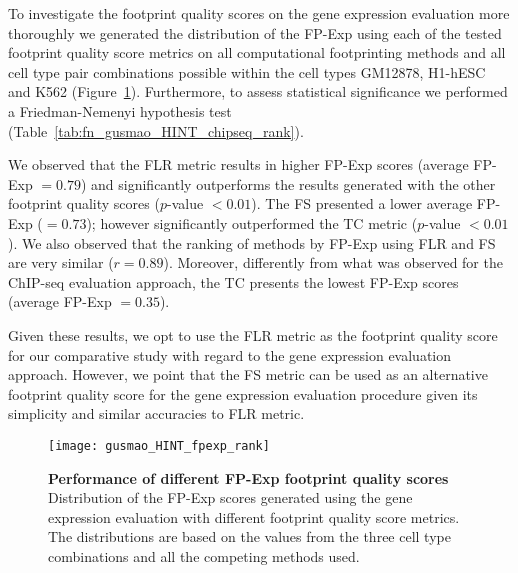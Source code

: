 To investigate the footprint quality scores on the gene expression evaluation more thoroughly we generated the distribution of the FP-Exp using each of the tested footprint quality score metrics on all computational footprinting methods and all cell type pair combinations possible within the cell types GM12878, H1-hESC and K562 (Figure~\ref{fig:gusmao_HINT_fpexp_rank}). Furthermore, to assess statistical significance we performed a Friedman-Nemenyi hypothesis test (Table~\ref{tab:fn_gusmao_HINT_chipseq_rank}).

We observed that the FLR metric results in higher FP-Exp scores (average FP-Exp $= 0.79$) and significantly outperforms the results generated with the other footprint quality scores ($p$-value $< 0.01$). The FS presented a lower average FP-Exp ($= 0.73$); however significantly outperformed the TC metric ($p$-value $< 0.01$). We also observed that the ranking of methods by FP-Exp using FLR and FS are very similar ($r=0.89$). Moreover, differently from what was observed for the ChIP-seq evaluation approach, the TC presents the lowest FP-Exp scores (average FP-Exp $= 0.35$).

Given these results, we opt to use the FLR metric as the footprint quality score for our comparative study with regard to the gene expression evaluation approach. However, we point that the FS metric can be used as an alternative footprint quality score for the gene expression evaluation procedure given its simplicity and similar accuracies to FLR metric.

\begin{figure}[h!]
\centering
\texttt{[image: gusmao\_HINT\_fpexp\_rank]}
\caption[Performance of different FP-Exp footprint quality scores]{\textbf{Performance of different FP-Exp footprint quality scores} Distribution of the FP-Exp scores generated using the gene expression evaluation with different footprint quality score metrics. The distributions are based on the values from the three cell type combinations and all the competing methods used.}
\label{fig:gusmao_HINT_fpexp_rank}
\end{figure}

